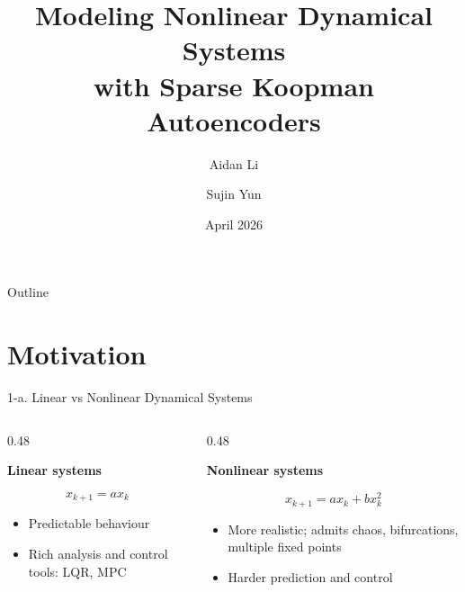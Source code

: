 \documentclass[aspectratio=169, 10pt]{beamer}
\title[Sparse Koopman Autoencoders]{Modeling Nonlinear Dynamical Systems\\[4pt]with Sparse Koopman Autoencoders}
\author{Aidan Li \and Sujin Yun}
\institute{MAT6215 -- Dynamical Systems \\ Université de Montréal}
\date{April 2026}
\begin{document}

\begin{frame}
  \titlepage
\end{frame}

\begin{frame}{Outline}
  \tableofcontents
\end{frame}

\section{Motivation}

\begin{frame}{1-a. Linear vs Nonlinear Dynamical Systems}

\begin{columns}[T,onlytextwidth]

\begin{column}{0.48\textwidth}

\textbf{Linear systems}

\[
x_{k+1} = a x_k
\]

\begin{itemize}
\item Predictable behaviour
\item Rich analysis and control tools: LQR, MPC
\end{itemize}

\vspace{0.7em}

\end{column}

\begin{column}{0.48\textwidth}

\textbf{Nonlinear systems}

\[
x_{k+1} = a x_k + b x_k^2
\]

\begin{itemize}
\item More realistic; admits chaos, bifurcations, multiple fixed points 
\item Harder prediction and control
\end{itemize}

\end{column}

\end{columns}

\vspace{0.4em}
\centering


\end{frame}
\end{document}
